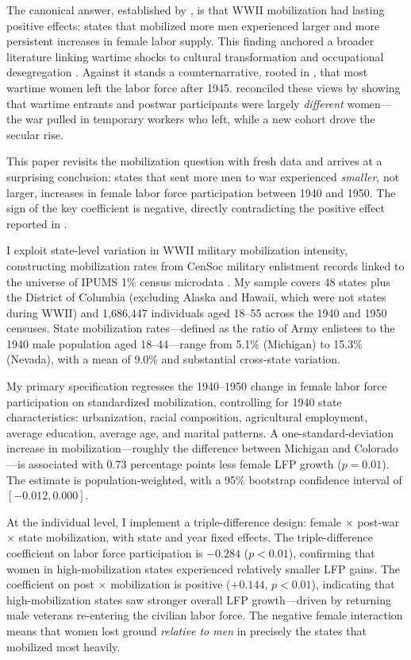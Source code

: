 \documentclass[12pt]{article}
\begin{document}
The canonical answer, established by \citet{acemoglu2004women}, is that WWII mobilization had lasting positive effects: states that mobilized more men experienced larger and more persistent increases in female labor supply. This finding anchored a broader literature linking wartime shocks to cultural transformation \citep{fernandez2004mothers, fogli2011culture} and occupational desegregation \citep{bellou2016occupations}. Against it stands a counternarrative, rooted in \citet{goldin1991role}, that most wartime women left the labor force after 1945. \citet{rose2018rise} reconciled these views by showing that wartime entrants and postwar participants were largely \textit{different} women---the war pulled in temporary workers who left, while a new cohort drove the secular rise.

This paper revisits the mobilization question with fresh data and arrives at a surprising conclusion: states that sent more men to war experienced \textit{smaller}, not larger, increases in female labor force participation between 1940 and 1950. The sign of the key coefficient is negative, directly contradicting the positive effect reported in \citet{acemoglu2004women}.

I exploit state-level variation in WWII military mobilization intensity, constructing mobilization rates from CenSoc military enlistment records \citep{cenSoc2024} linked to the universe of IPUMS 1\% census microdata \citep{ruggles2024ipums}. My sample covers 48 states plus the District of Columbia (excluding Alaska and Hawaii, which were not states during WWII) and 1,686,447 individuals aged 18--55 across the 1940 and 1950 censuses. State mobilization rates---defined as the ratio of Army enlistees to the 1940 male population aged 18--44---range from 5.1\% (Michigan) to 15.3\% (Nevada), with a mean of 9.0\% and substantial cross-state variation.

My primary specification regresses the 1940--1950 change in female labor force participation on standardized mobilization, controlling for 1940 state characteristics: urbanization, racial composition, agricultural employment, average education, average age, and marital patterns. A one-standard-deviation increase in mobilization---roughly the difference between Michigan and Colorado---is associated with 0.73 percentage points less female LFP growth ($p = 0.01$). The estimate is population-weighted, with a 95\% bootstrap confidence interval of $[-0.012, 0.000]$.

At the individual level, I implement a triple-difference design: female $\times$ post-war $\times$ state mobilization, with state and year fixed effects. The triple-difference coefficient on labor force participation is $-0.284$ ($p < 0.01$), confirming that women in high-mobilization states experienced relatively smaller LFP gains. The coefficient on post $\times$ mobilization is positive ($+0.144$, $p < 0.01$), indicating that high-mobilization states saw stronger overall LFP growth---driven by returning male veterans re-entering the civilian labor force. The negative female interaction means that women lost ground \textit{relative to men} in precisely the states that mobilized most heavily.
\end{document}
